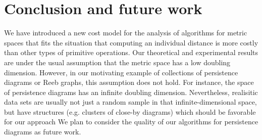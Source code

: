 \documentclass[a4paper,USenglish]{socg-lipics-v2018}
\newcommand{\dappr}{\tilde{d}}
\begin{document}








\section{Conclusion and future work}
\label{sec:conclusion}
%
We have introduced a new cost model for the analysis of algorithms
for metric spaces that fits the situation that computing an individual distance
is more costly than other types of primitive operations.
Our theoretical and experimental results are under the usual assumption
that the metric space has a low doubling dimension.
However, in our motivating example of collections of persistence diagrams
or Reeb graphs, this assumption does not hold. For instance,
the space of persistence diagrams has an infinite doubling dimension.
Nevertheless, realisitic data sets are usually not just a random sample
in that infinite-dimensional space, but have structures
(e.g. clusters of close-by diagrams) which should be favorable for our approach
We plan to consider the quality of our algorithms for persistence diagrams
as future work.
\end{document}
